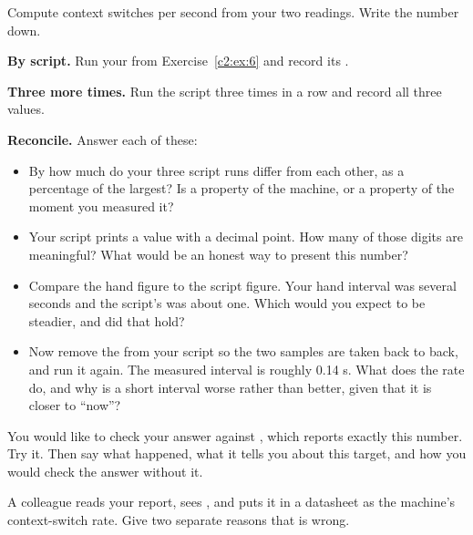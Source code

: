 
\noindent Compute context switches per second from your two readings. Write the number down.

 \textbf{By script.} Run your  from Exercise~\ref{c2:ex:6} and
record its .

 \textbf{Three more times.} Run the script three times in a row and record all three
values.

 \textbf{Reconcile.} Answer each of these:
\begin{itemize}
  \item By how much do your three script runs differ from each other, as a percentage of the
    largest? Is  a property of the machine, or a property of the moment you
    measured it?
  \item Your script prints a value with a decimal point. How many of those digits are meaningful?
    What would be an honest way to present this number?
  \item Compare the hand figure to the script figure. Your hand interval was several seconds and the
    script's was about one. Which would you expect to be steadier, and did that hold?
  \item Now remove the  from your script so the two samples are taken back to back, and
    run it again. The measured interval is roughly 0.14 s. What does the rate do, and why is a short
    interval worse rather than better, given that it is closer to ``now''?
\end{itemize}

 You would like to check your answer against , which reports exactly this
number. Try it. Then say what happened, what it tells you about this target, and how you would check
the answer without it.

 A colleague reads your report, sees , and puts it in a datasheet as
the machine's context-switch rate. Give two separate reasons that is wrong.
